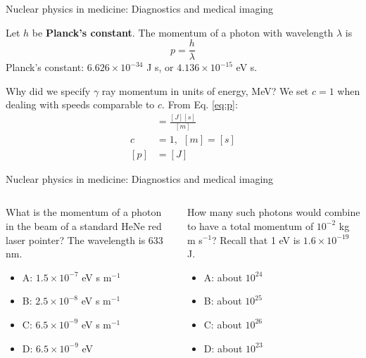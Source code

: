 \documentclass{beamer}
\begin{document}
\begin{frame}{Nuclear physics in medicine: Diagnostics and medical imaging}
\begin{tcolorbox}[colback=white,colframe=black!40!black,title=Photons have momentum]
\alert{Let $h$ be \textbf{Planck's constant}.  The momentum of a photon with wavelength $\lambda$ is
\begin{equation}
p = \frac{h}{\lambda} \label{eq:p}
\end{equation}
Planck's constant: $6.626 \times 10^{-34}$ J s, or $4.136 \times 10^{-15}$ eV s.}
\end{tcolorbox}
\vspace{0.25cm}
\small
Why did we specify $\gamma$ ray momentum in units of energy, MeV?  We set $c = 1$ when dealing with speeds comparable to $c$. From Eq. \ref{eq:p}:
\begin{align}
[p] &= \frac{[J] [s]}{[m]} \\
c &= 1, ~~ [m] = [s] \\
[p] &= [J]
\end{align}
\end{frame}

\begin{frame}{Nuclear physics in medicine: Diagnostics and medical imaging}
\small
\begin{columns}[T]
\begin{column}{0.5\textwidth}
What is the momentum of a photon in the beam of a standard HeNe red laser pointer?  The wavelength is 633 nm.
\begin{itemize}
\item A: $1.5 \times 10^{-7}$ eV s m$^{-1}$
\item B: $2.5 \times 10^{-8}$ eV s m$^{-1}$
\item C: $6.5 \times 10^{-9}$ eV s m$^{-1}$
\item D: $6.5 \times 10^{-9}$ eV
\end{itemize}
\end{column}
\begin{column}{0.5\textwidth}
How many such photons would combine to have a total momentum of $10^{-2}$ kg m s$^{-1}$?  Recall that 1 eV is $1.6 \times 10^{-19}$ J.
\begin{itemize}
\item A: about $10^{24}$
\item B: about $10^{25}$
\item C: about $10^{26}$
\item D: about $10^{23}$
\end{itemize}
\end{column}
\end{columns}
\end{frame}
\end{document}
